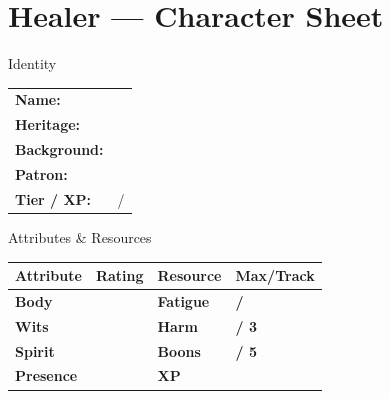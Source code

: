 \documentclass[10pt]{article}
\begin{document}
\newpage

\section*{Healer --- Character Sheet}

\begin{minipage}[t]{0.48\linewidth}
    \begin{charbox}{Identity}
        \begin{tabular}{p{2.5cm} p{5cm}}
            \textbf{Name:} & \underline{\hspace{4cm}} \\
            \textbf{Heritage:} & \underline{\hspace{4cm}} \\
            \textbf{Background:} & \underline{\hspace{4cm}} \\
            \textbf{Patron:} & \underline{\hspace{4cm}} \\
            \textbf{Tier / XP:} & \underline{\hspace{2cm}} / \underline{\hspace{2cm}} \\
        \end{tabular}
    \end{charbox}
    
    \vspace{0.5em}
    
    \begin{charbox}{Attributes \& Resources}
        \begin{tabular}{>{\bfseries}p{2.5cm} >{\bfseries}p{1.5cm} >{\bfseries}p{2.5cm} >{\bfseries}p{1.5cm}}
            \toprule
            \textbf{Attribute} & \textbf{Rating} & \textbf{Resource} & \textbf{Max/Track} \\
            \midrule
            Body & \underline{\hspace{1.5cm}} & Fatigue & \underline{\hspace{1.5cm}} / \underline{\hspace{1.5cm}} \\
            Wits & \underline{\hspace{1.5cm}} & Harm & \underline{\hspace{1.5cm}} / 3 \\
            Spirit & \underline{\hspace{1.5cm}} & Boons & \underline{\hspace{1.5cm}} / 5 \\
            Presence & \underline{\hspace{1.5cm}} & XP & \underline{\hspace{1.5cm}} \\
            \bottomrule
        \end{tabular}
    \end{charbox}
    

\end{minipage}
\end{document}
